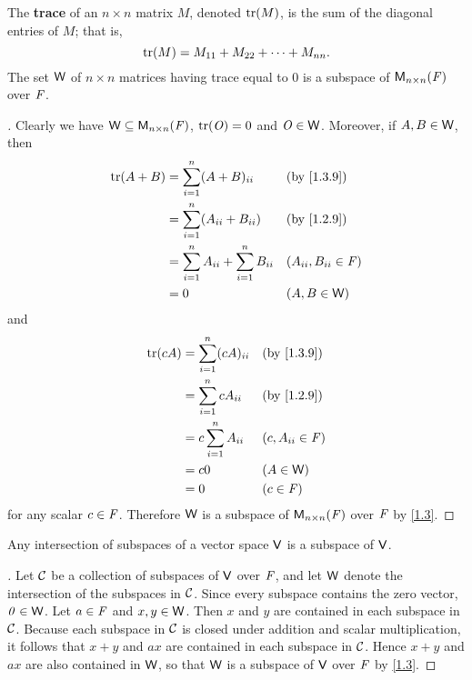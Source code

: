 \begin{eg}\label{1.3.9}
  The \textbf{trace} of an \(n \times n\) matrix \(M\), denoted \(\tr{M}\), is the sum of the diagonal entries of \(M\);
  that is,
  \[
    \tr{M} = M_{1 1} + M_{2 2} + \dots + M_{n n}.
  \]
  The set \(\mathsf{W}\) of \(n \times n\) matrices having trace equal to \(0\) is a subspace of \(\mathsf{M}_{{n} \times n}({\mathit{F}})\) over \(\mathit{F}\).
\end{eg}

\begin{proof}[]
  Clearly we have \(\mathsf{W} \subseteq \mathsf{M}_{{n} \times n}({\mathit{F}})\), \(\tr{\zm} = 0\) and \(\mathit{O} \in \mathsf{W}\).
  Moreover, if \(A, B \in \mathsf{W}\), then
  \begin{align*}
    \tr{A + B} & = \sum_{i = 1}^n (A + B)_{i i}                    &  & \text{(by \cref{1.3.9})}  \\
               & = \sum_{i = 1}^n (A_{i i} + B_{i i})              &  & \text{(by \cref{1.2.9})}  \\
               & = \sum_{i = 1}^n A_{i i} + \sum_{i = 1}^n B_{i i} &  & (A_{i i}, B_{i i} \in \F) \\
               & = 0                                               &  & (A, B \in \W)
  \end{align*}
  and
  \begin{align*}
    \tr{cA} & = \sum_{i = 1}^n (cA)_{i i} &  & \text{(by \cref{1.3.9})} \\
            & = \sum_{i = 1}^n cA_{i i}   &  & \text{(by \cref{1.2.9})} \\
            & = c \sum_{i = 1}^n A_{i i}  &  & (c, A_{i i} \in \F)      \\
            & = c0                        &  & (A \in \W)               \\
            & = 0                         &  & (c \in \F)
  \end{align*}
  for any scalar \(c \in \mathit{F}\).
  Therefore \(\mathsf{W}\) is a subspace of \(\mathsf{M}_{{n} \times n}({\mathit{F}})\) over \(\mathit{F}\) by \cref{1.3}.
\end{proof}

\begin{thm}\label{1.4}
  Any intersection of subspaces of a vector space \(\mathsf{V}\) is a subspace of \(\mathsf{V}\).
\end{thm}

\begin{proof}[]
  Let \(\mathcal{C}\) be a collection of subspaces of \(\mathsf{V}\) over \(\mathit{F}\), and let \(\mathsf{W}\) denote the intersection of the subspaces in \(\mathcal{C}\).
  Since every subspace contains the zero vector, \(\mathit{0} \in \mathsf{W}\).
  Let \(a \in \mathit{F}\) and \(x, y \in \mathsf{W}\).
  Then \(x\) and \(y\) are contained in each subspace in \(\mathcal{C}\).
  Because each subspace in \(\mathcal{C}\) is closed under addition and scalar multiplication, it follows that \(x + y\) and \(ax\) are contained in each subspace in \(\mathcal{C}\).
  Hence \(x + y\) and \(ax\) are also contained in \(\mathsf{W}\), so that \(\mathsf{W}\) is a subspace of \(\mathsf{V}\) over \(\mathit{F}\) by \cref{1.3}.
\end{proof}

